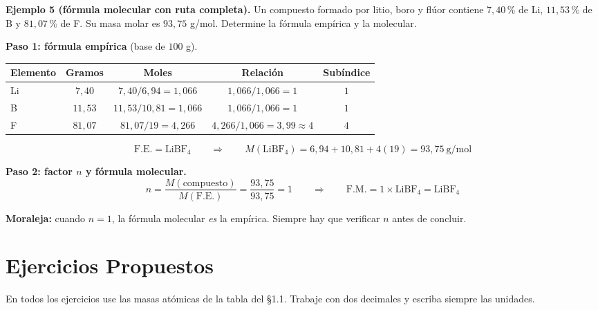 \documentclass[12pt, letterpaper]{article}
\newcommand{\pc}{\text{\%}}
\begin{document}
\noindent\textbf{Ejemplo 5 (fórmula molecular con ruta completa).} Un compuesto formado por litio, boro y flúor contiene $7{,}40\,\pc$ de Li, $11{,}53\,\pc$ de B y $81{,}07\,\pc$ de F. Su masa molar es $93{,}75$ g/mol. Determine la fórmula empírica y la molecular.

\begin{cuadrosolucion}
  \textbf{Paso 1: fórmula empírica} (base de $100$ g).

  \begin{center}
    \small
    \setlength{\tabcolsep}{6pt}
    \begin{tabular}{lcccc}
      \toprule
      Elemento & Gramos & Moles & Relación & Subíndice \\
      \midrule
      Li & $7{,}40$  & $7{,}40/6{,}94 = 1{,}066$  & $1{,}066/1{,}066 = 1$ & $1$ \\
      B  & $11{,}53$ & $11{,}53/10{,}81 = 1{,}066$ & $1{,}066/1{,}066 = 1$ & $1$ \\
      F  & $81{,}07$ & $81{,}07/19 = 4{,}266$     & $4{,}266/1{,}066 = 3{,}99 \approx 4$ & $4$ \\
      \bottomrule
    \end{tabular}
  \end{center}

  \[
    \text{F.E.} = \text{LiBF}_4
    \qquad\Longrightarrow\qquad
    M(\text{LiBF}_4) = 6{,}94 + 10{,}81 + 4(19) = 93{,}75\ \text{g/mol}
  \]

  \textbf{Paso 2: factor $n$ y fórmula molecular.}
  \[
    n = \frac{M(\text{compuesto})}{M(\text{F.E.})} = \frac{93{,}75}{93{,}75} = 1
    \qquad\Longrightarrow\qquad
    \text{F.M.} = 1\times\text{LiBF}_4 = \boxed{\text{LiBF}_4}
  \]

  \textbf{Moraleja:} cuando $n = 1$, la fórmula molecular \emph{es} la empírica. Siempre hay que verificar $n$ antes de concluir.
\end{cuadrosolucion}

\section{Ejercicios Propuestos}

\noindent En todos los ejercicios use las masas atómicas de la tabla del §1.1. Trabaje con dos decimales y escriba siempre las unidades.

\end{document}
